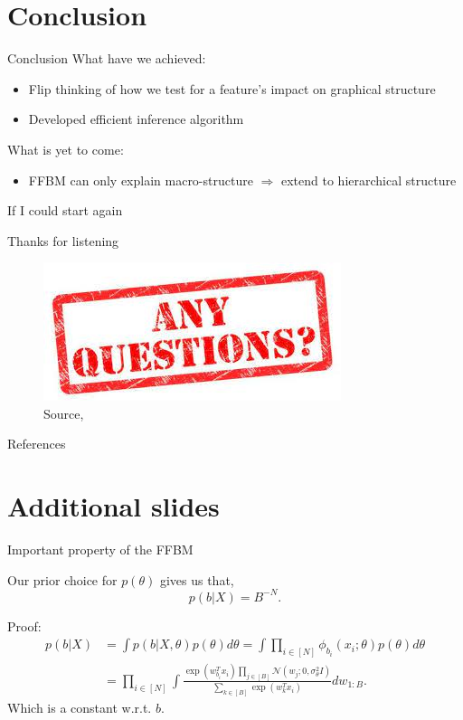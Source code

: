\documentclass{beamer}
\newcommand{\Gaussian}{\mathcal{N}}
\begin{document}
\section{Conclusion}

	\begin{frame}{Conclusion}
		What have we achieved:
		\begin{itemize}
			\item Flip thinking of how we test for a feature's impact on graphical structure
			\item Developed efficient inference algorithm
		\end{itemize}
		What is yet to come:
		\begin{itemize}
			\item FFBM can only explain macro-structure $\Rightarrow$ extend to hierarchical structure
		\end{itemize}
		If I could start again
	\end{frame}

	
	\begin{frame}{Thanks for listening}
		\begin{figure}
			\includegraphics[width=0.6\linewidth]{any-questions.jpg}
			\caption{Source, \citet{any-Qs}}
		\end{figure}

	\end{frame}

	\begin{frame}{References}
		\tiny
		
	\end{frame}

\section*{Additional slides}

	\begin{frame}{Important property of the FFBM}
		\begin{theorem}
			Our prior choice for $p(\theta)$ gives us that,
			$$p(b|X) = B^{-N}.$$
		\end{theorem}
		
		Proof:
		\begin{align*}
			p(b | X) &= \int p(b | X, \theta) p(\theta) d\theta = \int \prod_{i \in [N] } \phi_{b_i}(x_i; \theta) p(\theta) d\theta \\
			&= \prod_{i \in [N]} \int \frac{\exp(w_{b_i}^T x_i) \prod_{j \in [B]} \Gaussian(w_j; 0, \sigma_\theta^2 I)}{\sum_{k \in [B]} \exp(w_{k}^T x_i)} dw_{1:B}.
		\end{align*}
		Which is a constant w.r.t. $b$.
	\end{frame}
\end{document}
